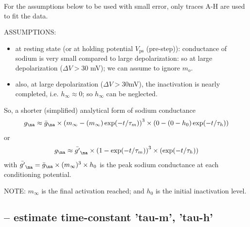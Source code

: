 For the assumptions below to be used with small error, only traces
A-H are used to fit the data.

ASSUMPTIONS:
\begin{itemize}
  
  \item at resting state (or at holding potential $V_\text{ps}$ (pre-step)):
  conductance of sodium is very small compared to large depolarization: so at
  large depolarization ($\Delta V >30$ mV); we can assume to ignore $m_o$.

  
  \item also, at large depolarization ($\Delta V > 30$mV), the inactivation is
  nearly completed, i.e.  $h_\infty \approx 0$; so $h_\infty$ can be neglected.
  
\end{itemize}

So, a shorter (simplified) analytical form of sodium conductance
\begin{equation}
g_\na  \approx \bar{g}_{\na} \times \left( m_\infty - (m_\infty ) \exp
(-t/\tau_m) \right)^3 \times \left( 0 - ( 0 - h_0) \exp
(-t/\tau_h)\right)  
\end{equation}
or
\begin{equation}
\label{eq:HH-Na-conductance-reduced-form}
g_\na  \approx
\bar{g'}_{\na} \times \left( 1 - \exp(-t/\tau_m) \right)^3 \times \left(\exp
(-t/\tau_h)\right)
\end{equation}
with $\bar{g'}_{\na} = \bar{g}_{\na} \times (m_\infty)^3 \times h_0$ is the
peak sodium conductance at each conditioning potential.

NOTE: $m_\infty$ is the final activation reached; and $h_0$ is the initial
inactivation level. 

\subsection{-- estimate time-constant 'tau-m', 'tau-h'}
\label{sec:estimate-tau-m-tau-h-HH}

